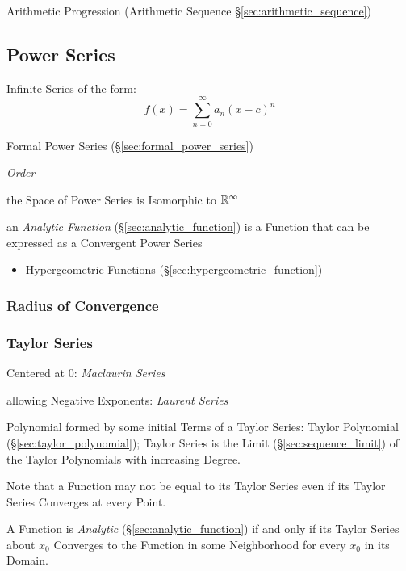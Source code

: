 Arithmetic Progression (Arithmetic Sequence
\S\ref{sec:arithmetic_sequence})



\subsection{Power Series}\label{sec:power_series}

Infinite Series of the form:
\[
  f(x) = \sum_{n=0}^\infty a_n (x - c)^n
\]

\fist Formal Power Series (\S\ref{sec:formal_power_series})

\emph{Order}

the Space of Power Series is Isomorphic to $\mathbb{R}^\infty$

an \emph{Analytic Function} (\S\ref{sec:analytic_function}) is a Function that
can be expressed as a Convergent Power Series

\begin{itemize}
  \item Hypergeometric Functions (\S\ref{sec:hypergeometric_function})
\end{itemize}



\subsubsection{Radius of Convergence}\label{sec:radius_of_convergence}

\subsubsection{Taylor Series}\label{sec:taylor_series}

Centered at $0$: \emph{Maclaurin Series}

allowing Negative Exponents: \emph{Laurent Series}

Polynomial formed by some initial Terms of a Taylor Series: Taylor
Polynomial (\S\ref{sec:taylor_polynomial}); Taylor Series is the Limit
(\S\ref{sec:sequence_limit}) of the Taylor Polynomials with increasing
Degree.

Note that a Function may not be equal to its Taylor Series even if its
Taylor Series Converges at every Point.

A Function is \emph{Analytic} (\S\ref{sec:analytic_function}) if and only if
its Taylor Series about $x_0$ Converges to the Function in some Neighborhood
for every $x_0$ in its Domain.

